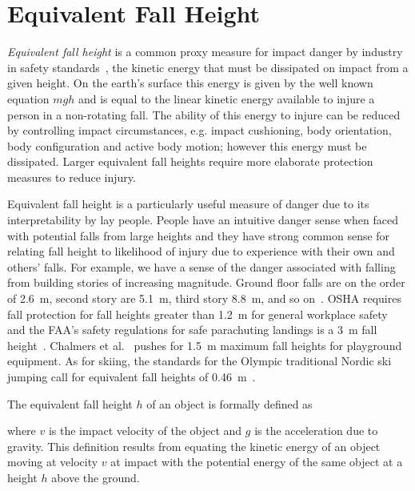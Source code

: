 \documentclass{article}
\begin{document}
\section{Equivalent Fall Height}
%
\emph{Equivalent fall height} is a common proxy measure for impact danger by
industry in safety standards~\cite{Hubbard2012}, the kinetic energy that must
be dissipated on impact from a given height. On the earth's surface this energy
is given by the well known equation $mgh$ and is equal to the linear kinetic
energy available to injure a person in a non-rotating fall. The ability of this
energy to injure can be reduced by controlling impact circumstances, e.g.
impact cushioning, body orientation, body configuration and active body motion;
however this energy must be dissipated. Larger equivalent fall heights require
more elaborate protection measures to reduce injury.

Equivalent fall height is a particularly useful measure of danger due to its
interpretability by lay people. People have an intuitive danger sense when
faced with potential falls from large heights and they have strong common sense
for relating fall height to likelihood of injury due to experience with their
own and others' falls. For example, we have a sense of the danger associated
with falling from building stories of increasing magnitude. Ground floor falls
are on the order of 2.6~\si{\meter}, second story are 5.1~\si{\meter}, third
story 8.8~\si{\meter}, and so on~\cite{Vish2005}. OSHA requires fall protection
for fall heights greater than 1.2~\si{\meter} for general workplace
safety~ and the FAA's safety regulations for safe parachuting
landings is a 3~\si{\meter} fall height~.  Chalmers et
al.~\cite{Chalmers1996} pushes for 1.5~\si{\meter} maximum fall heights for
playground equipment. As for skiing, the standards for the Olympic traditional
Nordic ski jumping call for equivalent fall heights of
0.46~\si{\meter}~.

The equivalent fall height $h$ of an object is formally defined as
%
  
%
where $v$ is the impact velocity of the object and $g$ is the acceleration due
to gravity. This definition results from equating the kinetic energy of an
object moving at velocity $v$ at impact with the potential energy of the same
object at a height $h$ above the ground.
\end{document}
